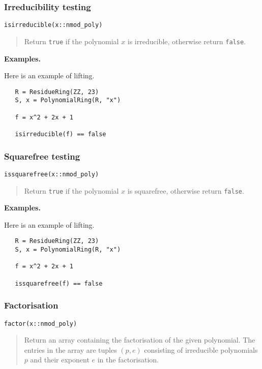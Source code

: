 \documentclass[a4paper,10pt]{article}
\newcommand{\code}{\lstinline}
\newcommand{\desc}[1]{\vspace{-3mm}\begin{quote}#1\end{quote}}
\begin{document}
{{\subsubsection{Irreducibility testing}

\begin{lstlisting}
isirreducible(x::nmod_poly)
\end{lstlisting}

\desc{Return \code{true} if the polynomial $x$ is irreducible, otherwise return \code{false}.}

\textbf{Examples.}

Here is an example of lifting.

\begin{lstlisting}
   R = ResidueRing(ZZ, 23)
   S, x = PolynomialRing(R, "x")

   f = x^2 + 2x + 1

   isirreducible(f) == false
\end{lstlisting}

\subsubsection{Squarefree testing}

\begin{lstlisting}
issquarefree(x::nmod_poly)
\end{lstlisting}

\desc{Return \code{true} if the polynomial $x$ is squarefree, otherwise return \code{false}.}

\textbf{Examples.}

Here is an example of lifting.

\begin{lstlisting}
   R = ResidueRing(ZZ, 23)
   S, x = PolynomialRing(R, "x")

   f = x^2 + 2x + 1

   issquarefree(f) == false
\end{lstlisting}

\subsubsection{Factorisation}

\begin{lstlisting}
factor(x::nmod_poly)
\end{lstlisting}

\desc{Return an array containing the factorisation of the given polynomial. The entries in
the array are tuples $(p, e)$ consisting of irreducible polynomials $p$ and their exponent
$e$ in the factorisation.}

}}
\end{document}
